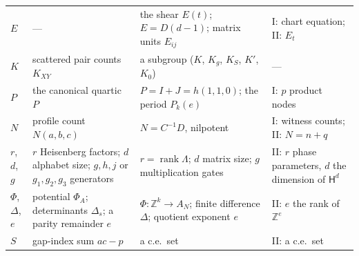 \documentclass[11pt,letterpaper]{article}
\theoremstyle{definition}
\theoremstyle{remark}
\newcommand{\Z}{\mathbb Z}
\newcommand{\HH}{\mathsf H}
\newcommand{\rank}{\operatorname{rank}}
\begin{document}
\begin{center}
\begin{longtable}{@{}L{.09\textwidth}L{.27\textwidth}L{.31\textwidth}L{.21\textwidth}@{}}
$E$ & --- & the shear $E(t)$; $E=D(d-1)$; matrix units $E_{ij}$ & I: chart equation; II: $E_t$\\
$K$ & scattered pair counts $K_{XY}$ & a subgroup ($K$, $K_g$, $K_S$, $K'$, $K_0$) & ---\\
$P$ & the canonical quartic $P$ & $P=I+J=h(1,1,0)$; the period $P_k(e)$ & I: $p$ product nodes\\
$N$ & profile count $N(a,b,c)$ & $N=C^{-1}D$, nilpotent & I: witness counts; II: $N=n+q$\\
$r$, $d$, $g$ & $r$ Heisenberg factors; $d$ alphabet size; $g,h,j$ or $g_1,g_2,g_3$ generators & $r=\rank\Lambda$; $d$ matrix size; $g$ multiplication gates & II: $r$ phase parameters, $d$ the dimension of $\HH^d$\\
$\Phi$, $\Delta$, $e$ & potential $\Phi_A$; determinants $\Delta_s$; a parity remainder $e$ & $\Phi:\Z^k\to A_N$; finite difference $\Delta$; quotient exponent $e$ & II: $e$ the rank of $\Z^e$\\
$S$ & gap-index sum $ac-p$ & a c.e.\ set & II: a c.e.\ set\\
\bottomrule
\end{longtable}
\end{center}
\end{document}
